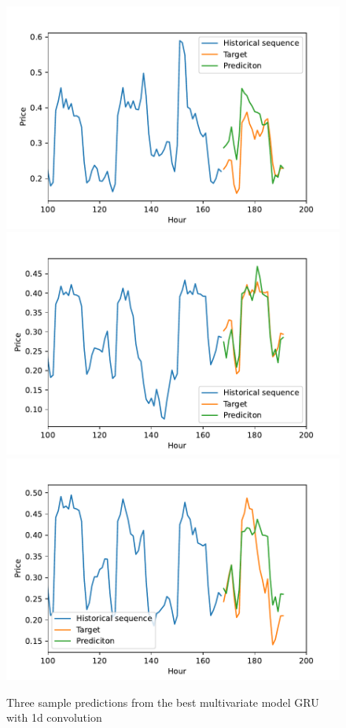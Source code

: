 \documentclass
[twocolumn,
secnumarabic,
nobibnotes,
aps,
prl,
reprint,
groupedaddress,
amsmath,
amssymb,
]{revtex4-2}
\begin{document}
\begin{figure}
  \includegraphics[width=\columnwidth]{figures/multivariate_predictions_convGRU_testsample11.pdf}
  \includegraphics[width=\columnwidth]{figures/multivariate_predictions_convGRU_testsample24.pdf}
  \includegraphics[width=\columnwidth]{figures/multivariate_predictions_convGRU_testsample98.pdf}  
  \caption{\label{fig:multivariate_best_predictions} Three sample predictions from the best multivariate model GRU with 1d convolution}
\end{figure}
\end{document}
